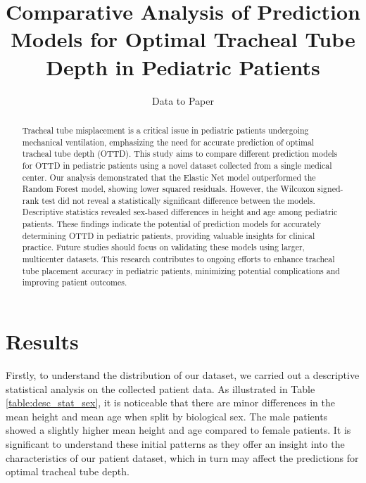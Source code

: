 \documentclass[11pt]{article}
\title{Comparative Analysis of Prediction Models for Optimal Tracheal Tube Depth in Pediatric Patients}
\author{Data to Paper}
\begin{document}
\maketitle
\begin{abstract}
Tracheal tube misplacement is a critical issue in pediatric patients undergoing mechanical ventilation, emphasizing the need for accurate prediction of optimal tracheal tube depth (OTTD). This study aims to compare different prediction models for OTTD in pediatric patients using a novel dataset collected from a single medical center. Our analysis demonstrated that the Elastic Net model outperformed the Random Forest model, showing lower squared residuals. However, the Wilcoxon signed-rank test did not reveal a statistically significant difference between the models. Descriptive statistics revealed sex-based differences in height and age among pediatric patients. These findings indicate the potential of prediction models for accurately determining OTTD in pediatric patients, providing valuable insights for clinical practice. Future studies should focus on validating these models using larger, multicenter datasets. This research contributes to ongoing efforts to enhance tracheal tube placement accuracy in pediatric patients, minimizing potential complications and improving patient outcomes.
\end{abstract}
\section*{Results}

Firstly, to understand the distribution of our dataset, we carried out a descriptive statistical analysis on the collected patient data. As illustrated in Table {}\ref{table:desc_stat_sex}, it is noticeable that there are minor differences in the mean height and mean age when split by biological sex. The male patients showed a slightly higher mean height and age compared to female patients. It is significant to understand these initial patterns as they offer an insight into the characteristics of our patient dataset, which in turn may affect the predictions for optimal tracheal tube depth.
\end{document}
